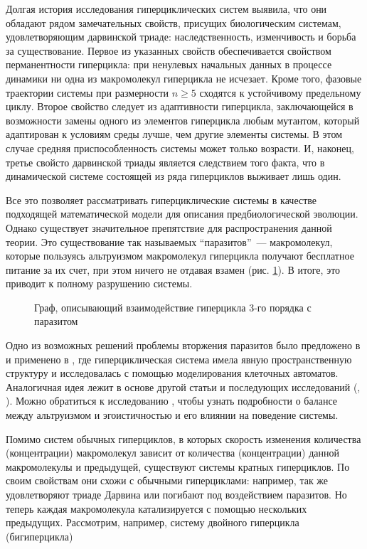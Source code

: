 Долгая история исследования гиперциклических систем выявила, что они обладают рядом замечательных свойств, присущих биологическим системам, удовлетворяющим дарвинской триаде: наследственность, изменчивость и борьба за существование. Первое из указанных свойств обеспечивается свойством перманентности гиперцикла: при ненулевых начальных данных в процессе динамики ни одна из макромолекул гиперцикла не исчезает. Кроме того, фазовые траектории системы при размерности $n \ge 5$ сходятся к устойчивому предельному циклу. Второе свойство следует из адаптивности гиперцикла, заключающейся в возможности замены одного из элементов гиперцикла любым мутантом, который адаптирован к условиям среды лучше, чем другие элементы системы. В этом случае средняя приспособленность системы может только возрасти. И, наконец, третье свойсто дарвинской триады является следствием того факта, что в динамической системе состоящей из ряда гиперциклов выживает лишь один. 

Все это позволяет рассматривать гиперциклические системы в качестве подходящей математической модели для описания предбиологической эволюции. Однако существует значительное препятствие для распространения данной теории. Это существование так называемых ``паразитов''\, --- макромолекул, которые пользуясь альтруизмом макромолекул гиперцикла получают бесплатное питание за их счет, при этом ничего не отдавая взамен (рис. \ref{lr_fig4}). В итоге, это приводит к полному разрушению системы. 

\begin{figure}[ht]
\caption{Граф, описывающий взаимодействие гиперцикла 3-го порядка с паразитом}
\label{lr_fig4}
\end{figure}

Одно из возможных решений проблемы вторжения паразитов было предложено в \cite{Boerlijst} и применено в \cite{Szab}, где гиперциклическая система имела явную пространственную структуру и исследовалась с помощью моделирования клеточных автоматов. Аналогичная идея лежит в основе другой статьи \cite{Bresch} и последующих исследований (\cite{Hogeweg}, \cite{Takeuchi}). Можно обратиться к исследованию \cite{Sigmund}, чтобы узнать подробности о балансе между альтруизмом и эгоистичностью и его влиянии на поведение системы.

Помимо систем обычных гиперциклов, в которых скорость изменения количества (концентрации) макромолекул зависит от количества (концентрации) данной макромолекулы и предыдущей, существуют системы кратных гиперциклов. По своим свойствам они схожи с обычными гиперциклами: например, так же удовлетворяют триаде Дарвина или погибают под воздействием паразитов. Но теперь каждая макромолекула катализируется с помощью нескольких предыдущих. Рассмотрим, например, систему двойного гиперцикла (бигиперцикла)

